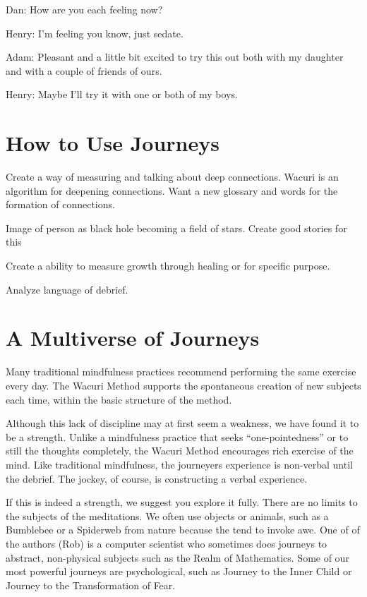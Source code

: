 \documentclass[12pt]{book}
\begin{document}
Dan: How are you each feeling now?

Henry: I'm feeling you know, just sedate.

Adam: Pleasant and a little bit excited to try this out both with my daughter and with a couple of friends of ours.

Henry: Maybe I'll try it with one or both of my boys.




\chapter{How to Use Journeys}


Create a way of measuring and talking about deep connections. Wacuri
is an algorithm for deepening connections. Want a new glossary and
words for the formation of connections.

Image of person as black hole becoming a field of stars. Create good
stories for this

Create a ability to measure growth through healing or for specific
purpose.

Analyze language of debrief.

\chapter{ A Multiverse of Journeys}

Many traditional mindfulness practices recommend performing the
same exercise every day. The Wacuri Method supports the
spontaneous creation of new subjects each time, within the
basic structure of the method.

Although this lack of discipline may at first seem a weakness,
we have found it to be a strength. Unlike a mindfulness practice
that seeks ``one-pointedness'' or to still the thoughts completely,
the Wacuri Method encourages rich exercise of the mind. Like
traditional mindfulness, the journeyers experience is non-verbal
until the debrief. The jockey, of course, is constructing a
verbal experience.

If this is indeed a strength, we suggest you explore it
fully. There are no limits to the subjects of the meditations.
We often use objects or animals, such as a Bumblebee or a
Spiderweb from nature because the
tend to invoke awe. One of of the authors (Rob) is a
computer scientist who sometimes does journeys to abstract,
non-physical subjects such as the Realm of Mathematics.
Some of our most powerful journeys are psychological, such
as Journey to the Inner Child or Journey to the Transformation
of Fear.
\end{document}
